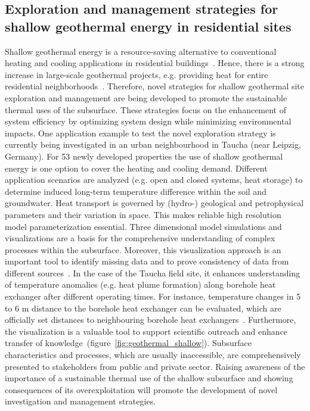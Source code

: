 \documentclass[twocolumn]{svjour3}          %
\begin{document}
\subsection{Exploration and management strategies for shallow geothermal energy in residential sites}
\label{shallow-geothermal}

Shallow geothermal energy is a resource-saving alternative to conventional heating and cooling applications in residential buildings~\cite{haehnlein:2013}. Hence, there is a strong increase in large-scale geothermal projects, e.g. providing heat for entire residential neighborhoods~\cite{alkan:2013}. Therefore, novel strategies for shallow geothermal site exploration and management are being developed to promote the sustainable thermal uses of the subsurface. These strategies focus on the enhancement of system efficiency by optimizing system design while minimizing environmental impacts. One application example to test the novel exploration strategy is currently being investigated in an urban neighbourhood in Taucha (near Leipzig, Germany). For 53 newly developed properties the use of shallow geothermal energy is one option to cover the heating and cooling demand. Different application scenarios are analyzed (e.g. open and closed systems, heat storage) to determine induced long-term temperature difference within the soil and groundwater. Heat transport is governed by (hydro-) geological and petrophysical parameters and their variation in space. This makes reliable high resolution model parameterization essential. Three dimensional model simulations and visualizations are a basis for the comprehensive understanding of complex processes within the subsurface. Moreover, this visualization approach is an important tool to identify missing data and to prove consistency of data from different sources~\cite{vienken:2014}. In the case of the Taucha field site, it enhances understanding of temperature anomalies (e.g. heat plume formation) along borehole heat exchanger after different operating times. For instance, temperature changes in 5 to 6 m distance to the borehole heat exchanger can be evaluated, which are officially set distances to neighbouring borehole heat exchangers~\cite{haehnlein:2011}. Furthermore, the visualization is a valuable tool to support scientific outreach and enhance transfer of knowledge~(figure~\ref{fig:geothermal_shallow}). Subsurface characteristics and processes, which are usually inaccessible, are comprehensively presented to stakeholders from public and private sector. Raising awareness of the importance of a sustainable thermal use of the shallow subsurface and showing consequences of its overexploitation will promote the development of novel investigation and management strategies.
\end{document}
